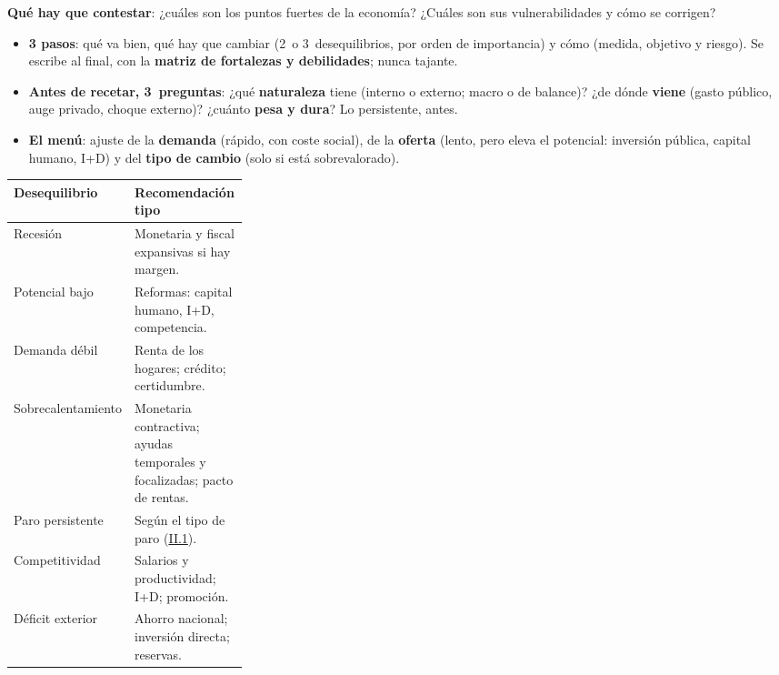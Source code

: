 \documentclass{article}
\begin{document}
\begin{columnas}
\begin{ideaclave}
\textbf{Qué hay que contestar}: ¿cuáles son los puntos fuertes de la economía? ¿Cuáles son sus vulnerabilidades y cómo se corrigen?
\end{ideaclave}
\begin{itemize}[itemsep=1.5pt]
\item \textbf{3 pasos}: qué va bien, qué hay que cambiar (2~o 3~desequilibrios, por orden de importancia) y cómo (medida, objetivo y riesgo). Se escribe al final, con la \textbf{matriz de fortalezas y debilidades}; nunca tajante.
\item \textbf{Antes de recetar, 3~preguntas}: ¿qué \textbf{naturaleza} tiene (interno o externo; macro o de balance)? ¿de dónde \textbf{viene} (gasto público, auge privado, choque externo)? ¿cuánto \textbf{pesa y dura}? Lo persistente, antes.
\item \textbf{El menú}: ajuste de la \textbf{demanda} (rápido, con coste social), de la \textbf{oferta} (lento, pero eleva el potencial: inversión pública, capital humano, I+D) y del \textbf{tipo de cambio} (solo si está sobrevalorado).
\end{itemize}
{\footnotesize\setlength{\tabcolsep}{3pt}\renewcommand{\arraystretch}{1.1}
\begin{tabularx}{\linewidth}{>{\raggedright\arraybackslash}p{0.3\linewidth}>{\raggedright\arraybackslash}X}
\toprule
\rowcolor{tceemoradopalido}\textbf{Desequilibrio} & \textbf{Recomendación tipo}\\
\midrule
Recesión & Monetaria y fiscal expansivas si hay margen.\\
\rowcolor{tceesalvia}Potencial bajo & Reformas: capital humano, I+D, competencia.\\
Demanda débil & Renta de los hogares; crédito; certidumbre.\\
\rowcolor{tceesalvia}Sobrecalentamiento & Monetaria contractiva; ayudas temporales y focalizadas; pacto de rentas.\\
Paro persistente & Según el tipo de paro (\hyperref[rep:II.1]{II.1}).\\
\rowcolor{tceesalvia}Competitividad & Salarios y productividad; I+D; promoción.\\
Déficit exterior & Ahorro nacional; inversión directa; reservas.\\

\end{tabularx}}
\end{columnas}
\end{document}
